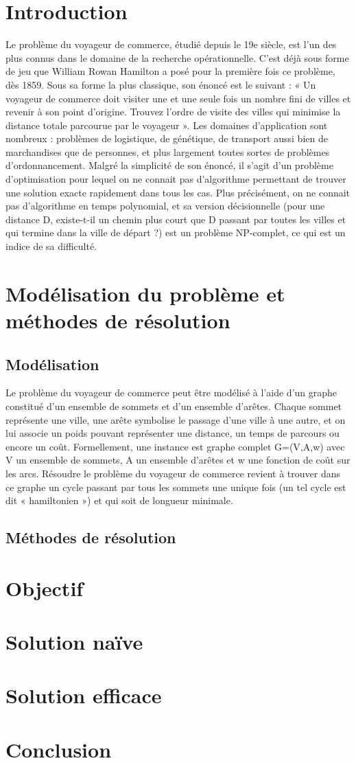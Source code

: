\documentclass[12pt, openany]{report}
\begin{document}
\section{Introduction}
Le problème du voyageur de commerce, étudié depuis le 19e siècle, est l’un des plus connus dans le domaine de la recherche opérationnelle. C’est déjà sous forme de jeu que William Rowan Hamilton a posé pour la première fois ce problème, dès 1859. Sous sa forme la plus classique, son énoncé est le suivant : « Un voyageur de commerce doit visiter une et une seule fois un nombre fini de villes et revenir à son point d’origine. Trouvez l’ordre de visite des villes qui minimise la distance totale parcourue par le voyageur ». Les domaines d’application sont nombreux : problèmes de logistique, de génétique, de transport aussi bien de marchandises que de personnes, et plus largement toutes sortes de problèmes d’ordonnancement.
Malgré la simplicité de son énoncé, il s'agit d'un problème d'optimisation pour lequel on ne connait pas d'algorithme permettant de trouver une solution exacte rapidement dans tous les cas. Plus précisément, on ne connait pas d'algorithme en temps polynomial, et sa version décisionnelle (pour une distance D, existe-t-il un chemin plus court que D passant par toutes les villes et qui termine dans la ville de départ ?) est un problème NP-complet, ce qui est un indice de sa difficulté.
\section{Modélisation du problème et méthodes de résolution}
\subsection{Modélisation}
Le problème du voyageur de commerce peut être modélisé à l’aide d’un graphe constitué d’un ensemble de sommets et d’un ensemble d’arêtes. Chaque sommet représente une ville, une arête symbolise le passage d’une ville à une autre, et on lui associe un poids pouvant représenter une distance, un temps de parcours ou encore un coût. Formellement, une instance est graphe complet G=(V,A,w) avec V un ensemble de sommets, A un ensemble d’arêtes et w une fonction de coût sur les arcs.
Résoudre le problème du voyageur de commerce revient à trouver dans ce graphe un cycle passant par tous les sommets une unique fois (un tel cycle est dit « hamiltonien ») et qui soit de longueur minimale.
\subsection{Méthodes de résolution}
\section{Objectif}
\section{Solution naïve}
\section{Solution efficace}
\section{Conclusion}
\end{document}
